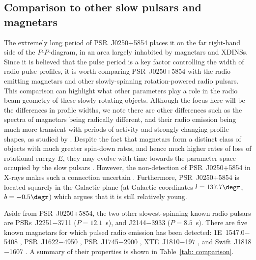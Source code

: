 \subsection{Comparison to other slow pulsars and magnetars}
\label{sec: J0250 - discussion - compare}

The extremely long period of PSR~J0250+5854 places it on the far right-hand side of the $P$-$\dot{P}$-diagram, in an area largely inhabited by magnetars and XDINSs. Since it is believed that the pulse period is a key factor controlling the width of radio pulse profiles, it is worth comparing PSR~J0250+5854 with the radio-emitting magnetars and other slowly-spinning rotation-powered radio pulsars. This comparison can highlight what other parameters play a role in the radio beam geometry of these slowly rotating objects. Although the focus here will be the differences in profile widths, we note there are other differences such as the spectra of magnetars being radically different, and their radio emission being much more transient with periods of activity and strongly-changing profile shapes, as studied by \citet{SSW+2009, DJW+2018, LLD+2019, DLB+2019}. Despite the fact that magnetars form a distinct class of objects with much greater spin-down rates, and hence much higher rates of loss of rotational energy $\dot{E}$, they may evolve with time towards the parameter space occupied by the slow pulsars \citep[e.g.][]{VRP+2013}. However, the non-detection of PSR~J0250+5854 in X-rays makes such a connection uncertain \citep{TBC+2018}. Furthermore, PSR~J0250+5854 is located squarely in the Galactic plane (at Galactic coordinates $l=137.7\degr$, $b=-0.5\degr$) which argues that it is still relatively young.

Aside from PSR~J0250+5854, the two other slowest-spinning known radio pulsars are PSRs~J2251$-$3711 ($P=12.1$~s), and J2144$-$3933 ($P=8.5$~s). There are five known magnetars for which pulsed radio emission has been detected: 1E~1547.0$-$5408 \citep{CRHR2007a}, PSR~J1622$-$4950 \citep{LBB+2010}, PSR~J1745$-$2900 \citep{EFK+2013}, XTE~J1810$-$197 \citep{CRH+2006}, and Swift~J1818$-$1607 \citep{ERB+2020, LSJB2020}. A summary of their properties is shown in Table~\ref{tab: comparison}.

